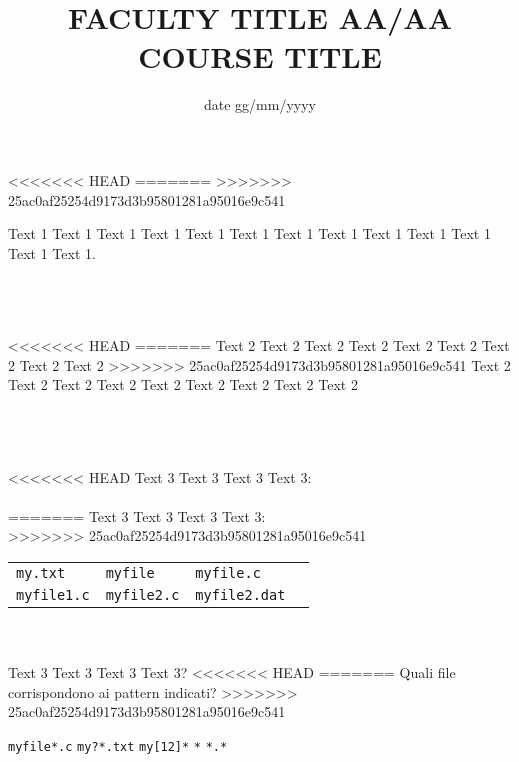 \documentclass[9pt]{exam}
\title{\vspace{-1em}FACULTY TITLE AA/AA\\\Large{COURSE TITLE}\vspace{-2.4em}}
\date{date gg/mm/yyyy\vspace{-1.5em}}
\begin{document}
\maketitle

\begin{center}
\end{center}

<<<<<<< HEAD
=======
>>>>>>> 25ac0af25254d9173d3b95801281a95016e9c541


\begin{questions}

\question
    Text 1 Text 1 Text 1 Text 1 Text 1 Text 1 Text 1 Text 1 Text 1 Text 1
    Text 1 Text 1 Text 1.\\\\
    \makebox[0.9\textwidth]{\$ \enspace\hrulefill}\\\\
    \makebox[0.9\textwidth]{\enspace\hrulefill}

\question
<<<<<<< HEAD
=======
    Text 2 Text 2 Text 2 Text 2 Text 2 Text 2 Text 2 Text 2 Text 2
>>>>>>> 25ac0af25254d9173d3b95801281a95016e9c541
    Text 2 Text 2 Text 2 Text 2 Text 2 Text 2 Text 2 Text 2 Text 2\\\\
    \makebox[0.9\textwidth]{\$ \enspace\hrulefill}\\\\
    \makebox[0.9\textwidth]{\enspace\hrulefill}

\question
<<<<<<< HEAD
    Text 3 Text 3 Text 3 Text 3:\\\\
=======
    Text 3 Text 3 Text 3 Text 3:\\
>>>>>>> 25ac0af25254d9173d3b95801281a95016e9c541
    \begin{tabular}{llll}
        \hline
        \texttt{my.txt} & \texttt{myfile} & \texttt{myfile.c}\\
        \texttt{myfile1.c} & \texttt{myfile2.c} & \texttt{myfile2.dat} \\
        \hline
    \end{tabular}\\\\
    Text 3 Text 3 Text 3 Text 3?
<<<<<<< HEAD
=======
    Quali file corrispondono ai pattern indicati?
>>>>>>> 25ac0af25254d9173d3b95801281a95016e9c541
    \begin{checkboxes}
        \choice \texttt{myfile*.c} \quad \makebox[0.6\textwidth]{\$ \enspace\hrulefill}
        \choice \texttt{my?*.txt}  \quad \makebox[0.6\textwidth]{\$ \enspace\hrulefill}
        \choice \texttt{my[12]*}   \quad \makebox[0.6\textwidth]{\$ \enspace\hrulefill}
        \choice \texttt{*}         \quad \makebox[0.6\textwidth]{\$ \enspace\hrulefill}
        \choice \texttt{*.*}       \quad \makebox[0.6\textwidth]{\$ \enspace\hrulefill}
    \end{checkboxes}


\end{questions}
\end{document}
